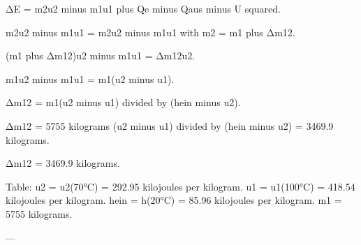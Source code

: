 ΔE = m2u2 minus m1u1 plus Qe minus Qaus minus U squared.  

m2u2 minus m1u1 = m2u2 minus m1u1 with m2 = m1 plus Δm12.  

(m1 plus Δm12)u2 minus m1u1 = Δm12u2.  

m1u2 minus m1u1 = m1(u2 minus u1).  

Δm12 = m1(u2 minus u1) divided by (hein minus u2).  

Δm12 = 5755 kilograms (u2 minus u1) divided by (hein minus u2) = 3469.9 kilograms.  

Δm12 = 3469.9 kilograms.  

Table:  
u2 = u2(70°C) = 292.95 kilojoules per kilogram.  
u1 = u1(100°C) = 418.54 kilojoules per kilogram.  
hein = h(20°C) = 85.96 kilojoules per kilogram.  
m1 = 5755 kilograms.  

---